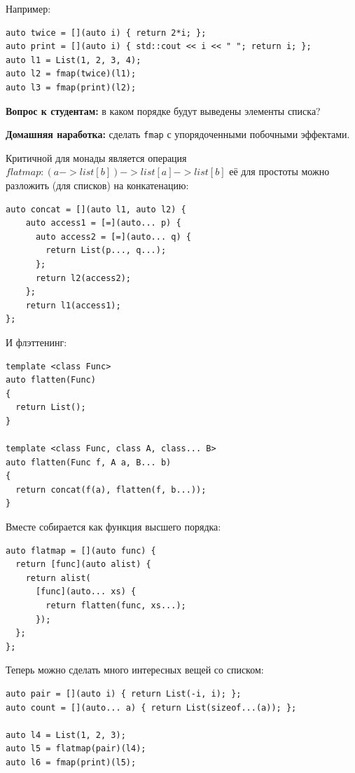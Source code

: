\documentclass[a4paper,12pt,oneside]{article}
\newif\ifanswers
\begin{document}
Например:

\begin{lstlisting}
auto twice = [](auto i) { return 2*i; };
auto print = [](auto i) { std::cout << i << " "; return i; };
auto l1 = List(1, 2, 3, 4);
auto l2 = fmap(twice)(l1);
auto l3 = fmap(print)(l2);
\end{lstlisting}

\textbf{Вопрос к студентам:} в каком порядке будут выведены элементы списка?

\ifanswers
Правильный ответ: практически в любом. Внутри \lstinline!fmap! будет сгенерирован вызов конструктора списка, который берет на вход вызовы функций вывода.
\fi

\textbf{Домашняя наработка:} сделать \lstinline!fmap! с упорядоченными побочными эффектами.

Критичной для монады является операция $flatmap: (a -> list[b]) -> list[a] -> list[b]$ её для простоты можно разложить (для списков) на конкатенацию:

\begin{lstlisting}
auto concat = [](auto l1, auto l2) {
    auto access1 = [=](auto... p) {
      auto access2 = [=](auto... q) {
        return List(p..., q...);
      };
      return l2(access2);
    };
    return l1(access1);
};
\end{lstlisting}

И флэттенинг:
 
\begin{lstlisting}
template <class Func>
auto flatten(Func)
{
  return List(); 
}
 
template <class Func, class A, class... B>
auto flatten(Func f, A a, B... b)
{
  return concat(f(a), flatten(f, b...));
}
\end{lstlisting}
 
Вместе собирается как функция высшего порядка:

\begin{lstlisting}
auto flatmap = [](auto func) {
  return [func](auto alist) {
    return alist(
      [func](auto... xs) { 
        return flatten(func, xs...);  
      });
  };
};
\end{lstlisting}

Теперь можно сделать много интересных вещей со списком:
	
\begin{lstlisting}
auto pair = [](auto i) { return List(-i, i); };
auto count = [](auto... a) { return List(sizeof...(a)); };
 
auto l4 = List(1, 2, 3);
auto l5 = flatmap(pair)(l4);
auto l6 = fmap(print)(l5); 
\end{lstlisting}
\end{document}
